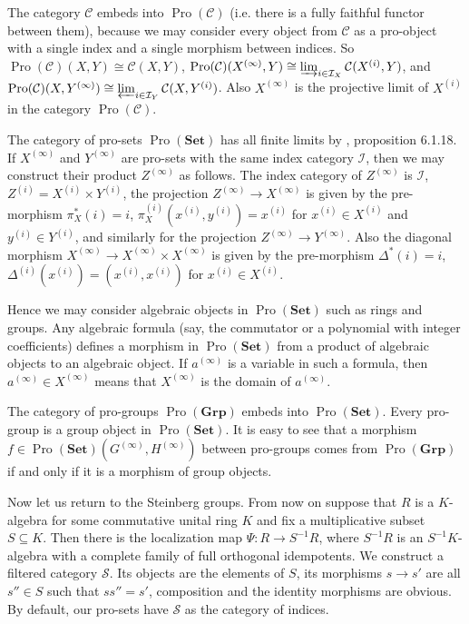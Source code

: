 \documentclass{article}
\newcommand{\rar}{\rightarrow}
\newcommand{\Set}{\mathbf{Set}}
\newcommand{\Group}{\mathbf{Grp}}
\DeclareMathOperator{\Pro}{Pro}
\begin{document}
The category \(\mathcal C\) embeds into \(\Pro(\mathcal C)\) (i.e. there is a fully faithful functor between them), because we may consider every object from \(\mathcal C\) as a pro-object with a single index and a single morphism between indices. So \(\Pro(\mathcal C)(X, Y) \cong \mathcal C(X, Y)\), \(\Pro(\mathcal C)(X^{(\infty)}, Y) \cong \varinjlim_{i \in \mathcal I_X} \mathcal C(X^{(i)}, Y)\), and \(\Pro(\mathcal C)(X, Y^{(\infty)}) \cong \varprojlim_{i \in \mathcal I_Y} \mathcal C(X, Y^{(i)})\). Also \(X^{(\infty)}\) is the projective limit of \(X^{(i)}\) in the category \(\Pro(\mathcal C)\).

The category of pro-sets \(\Pro(\Set)\) has all finite limits by \cite{}, proposition 6.1.18. If \(X^{(\infty)}\) and \(Y^{(\infty)}\) are pro-sets with the same index category \(\mathcal I\), then we may construct their product \(Z^{(\infty)}\) as follows. The index category of \(Z^{(\infty)}\) is \(\mathcal I\), \(Z^{(i)} = X^{(i)} \times Y^{(i)}\), the projection \(Z^{(\infty)} \rar X^{(\infty)}\) is given by the pre-morphism \(\pi_X^*(i) = i\), \(\pi_X^{(i)}(x^{(i)}, y^{(i)}) = x^{(i)}\) for \(x^{(i)} \in X^{(i)}\) and \(y^{(i)} \in Y^{(i)}\), and similarly for the projection \(Z^{(\infty)} \rar Y^{(\infty)}\). Also the diagonal morphism \(X^{(\infty)} \rar X^{(\infty)} \times X^{(\infty)}\) is given by the pre-morphism \(\Delta^*(i) = i\), \(\Delta^{(i)}(x^{(i)}) = (x^{(i)}, x^{(i)})\) for \(x^{(i)} \in X^{(i)}\).

Hence we may consider algebraic objects in \(\Pro(\Set)\) such as rings and groups. Any algebraic formula (say, the commutator or a polynomial with integer coefficients) defines a morphism in \(\Pro(\Set)\) from a product of algebraic objects to an algebraic object. If \(a^{(\infty)}\) is a variable in such a formula, then \(a^{(\infty)} \in X^{(\infty)}\) means that \(X^{(\infty)}\) is the domain of \(a^{(\infty)}\).

The category of pro-groups \(\Pro(\Group)\) embeds into \(\Pro(\Set)\). Every pro-group is a group object in \(\Pro(\Set)\). It is easy to see that a morphism \(f \in \Pro(\Set)(G^{(\infty)}, H^{(\infty)})\) between pro-groups comes from \(\Pro(\Group)\) if and only if it is a morphism of group objects.

Now let us return to the Steinberg groups. From now on suppose that \(R\) is a \(K\)-algebra for some commutative unital ring \(K\) and fix a multiplicative subset \(S \subseteq K\). Then there is the localization map \(\Psi \colon R \rar S^{-1} R\), where \(S^{-1} R\) is an \(S^{-1} K\)-algebra with a complete family of full orthogonal idempotents. We construct a filtered category \(\mathcal S\). Its objects are the elements of \(S\), its morphisms \(s \rar s'\) are all \(s'' \in S\) such that \(ss'' = s'\), composition and the identity morphisms are obvious. By default, our pro-sets have \(\mathcal S\) as the category of indices.
\end{document}
